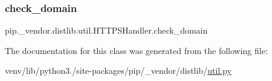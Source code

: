 \subsubsection{\texorpdfstring{check\+\_\+domain}{check\_domain}}
{\footnotesize\ttfamily pip.\+\_\+vendor.\+distlib.\+util.\+H\+T\+T\+P\+S\+Handler.\+check\+\_\+domain}



The documentation for this class was generated from the following file\+:\begin{DoxyCompactItemize}
\item 
venv/lib/python3./site-\/packages/pip/\+\_\+vendor/distlib/\hyperlink{pip_2__vendor_2distlib_2util_8py}{util.\+py}\end{DoxyCompactItemize}
